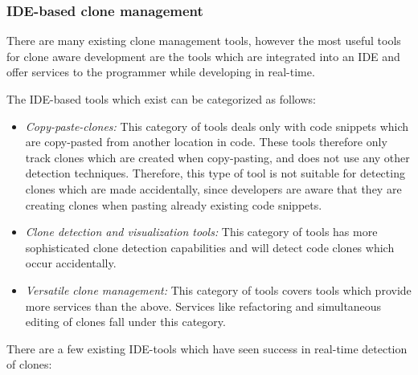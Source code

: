 \documentclass[12pt]{article}
\begin{document}
\subsubsection{IDE-based clone management}

There are many existing clone management tools, however the most useful tools for clone
aware development are the tools which are integrated into an IDE and offer services to the
programmer while developing in real-time.

The IDE-based tools which exist can be categorized as
follows\cite[8]{Udding_Towards_Convenient_Management}:

\begin{itemize}
	\item\textit{Copy-paste-clones:} This category of tools deals only with code snippets which are
	copy-pasted from another location in code. These tools therefore only track clones which
	are created when copy-pasting, and does not use any other detection techniques. Therefore,
	this type of tool is not suitable for detecting clones which are made accidentally, since
	developers are aware that they are creating clones when pasting already existing code
	snippets.

	\item\textit{Clone detection and visualization tools:} This category of tools has more
	sophisticated clone detection capabilities and will detect code clones which occur
	accidentally.

	\item\textit{Versatile clone management:} This category of tools covers tools which provide more
	services than the above. Services like refactoring and simultaneous editing of clones fall
	under this category.
\end{itemize}

There are a few existing IDE-tools which have seen success in real-time detection of clones:
\end{document}
